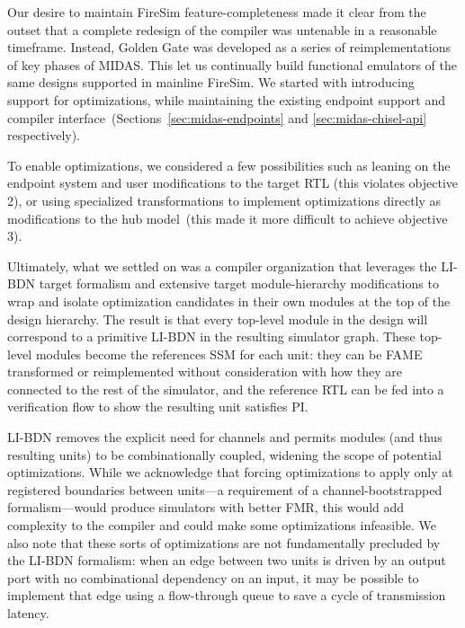 Our desire to maintain FireSim feature-completeness made it clear from the
outset that a complete redesign of the compiler was untenable in a reasonable timeframe. Instead, Golden
Gate was developed as a series of reimplementations of key phases of
MIDAS. This let us continually build functional emulators of the same designs
supported in mainline FireSim. We started with introducing support for
optimizations, while maintaining the existing endpoint support and compiler
interface~(Sections~\ref{sec:midas-endpoints} and \ref{sec:midas-chisel-api}
respectively).

To enable optimizations, we considered a few possibilities such as leaning on
the endpoint system and user modifications to the target RTL (this violates
objective 2), or using specialized transformations to implement optimizations
directly as modifications to the hub model~(this made it more difficult to
achieve objective 3).

Ultimately, what we settled on was a compiler organization that leverages the
LI-BDN target formalism and extensive target module-hierarchy modifications to
wrap and isolate optimization candidates in their own modules at the top of the
design hierarchy.  The result is that every top-level module in the design will
correspond to a primitive LI-BDN in the resulting simulator graph. These
top-level modules become the references SSM for each unit: they can be FAME
transformed or reimplemented without consideration with how they are connected
to the rest of the simulator, and the reference RTL can be fed into a
verification flow to show the resulting unit satisfies PI.

LI-BDN removes the explicit need for channels and permits modules (and thus resulting units) to be
combinationally coupled, widening the scope of potential optimizations. While we
acknowledge that forcing optimizations to apply only at registered boundaries
between units---a requirement of a channel-bootstrapped formalism---would
produce simulators with better FMR, this would add complexity to the
compiler and could make some optimizations infeasible. We also note that these
sorts of optimizations are not fundamentally precluded by the LI-BDN formalism: when an edge
between two units is driven by an output port with no combinational dependency on
an input, it may be possible to implement that edge using a flow-through queue to save a
cycle of transmission latency.

